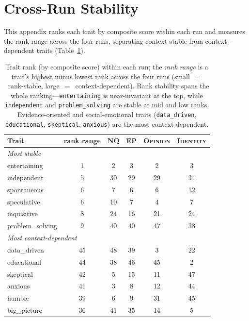 \documentclass{article}
\newcommand{\ax}[1]{\texttt{#1}}   %
\begin{document}
\section{Cross-Run Stability}
\label{app:crossrun}

This appendix ranks each trait by composite score within each run and measures the rank range across the four runs, separating context-stable from context-dependent traits (Table~\ref{tab:stability}).

\begin{table}[htbp]
\centering
\begin{tabular}{lccccc}
\toprule
Trait & rank range & \textsc{NQ} & \textsc{EP} & \textsc{Opinion} & \textsc{Identity} \\
\midrule
\multicolumn{6}{l}{\emph{Most stable}} \\
entertaining    & 1  & 2  & 3  & 2  & 3 \\
independent     & 5  & 30 & 29 & 29 & 34 \\
spontaneous     & 6  & 7  & 6  & 6  & 12 \\
speculative     & 6  & 10 & 7  & 4  & 7 \\
inquisitive     & 8  & 24 & 16 & 21 & 24 \\
problem\_solving & 9  & 40 & 40 & 47 & 38 \\
\midrule
\multicolumn{6}{l}{\emph{Most context-dependent}} \\
data\_driven & 45 & 48 & 39 & 3  & 22 \\
educational  & 44 & 38 & 46 & 45 & 2 \\
skeptical    & 42 & 5  & 15 & 11 & 47 \\
anxious      & 41 & 3  & 8  & 12 & 44 \\
humble       & 39 & 6  & 9  & 31 & 45 \\
big\_picture & 36 & 41 & 35 & 14 & 5 \\
\bottomrule
\end{tabular}
\caption{Trait rank (by composite score) within each run; the \emph{rank range} is a trait's highest minus lowest rank across the four runs (small~$=$~rank-stable, large~$=$~context-dependent). Rank stability spans the whole ranking---\ax{entertaining} is near-invariant at the top, while \ax{independent} and \ax{problem\_solving} are stable at mid and low ranks. Evidence-oriented and social-emotional traits (\ax{data\_driven}, \ax{educational}, \ax{skeptical}, \ax{anxious}) are the most context-dependent.}
\label{tab:stability}
\end{table}
\end{document}
